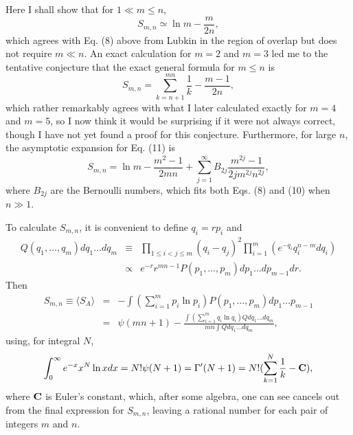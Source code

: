 Here I shall show that for $1\ll m\leq n$,
	\begin{equation}
	S_{m,n} \simeq \ln m - \frac{m}{2n},
	\end{equation}
which agrees with Eq. (8) above from Lubkin \cite{L1} in the region
of overlap
but does not require $m\ll n$.  An exact calculation for $m=2$ and
$m=3$ led me
to the tentative conjecture that the exact general formula for $m\leq
n$ is
	\begin{equation}
	S_{m,n}=\sum_{k=n+1}^{mn}\frac{1}{k} - \frac{m-1}{2n},
	\end{equation}
which rather remarkably agrees with what I later calculated exactly
for $m=4$
and $m=5$, so I now think it would be surprising if it were not
always correct,
though I have not yet found a proof for this conjecture.
Furthermore, for
large $n$, the asymptotic expansion for Eq. (11) is
	\begin{equation}
	S_{m,n}=\ln m - \frac{m^2-1}{2mn}
	+ \sum_{j=1}^{\infty} B_{2j} \frac{m^{2j}-1}{2jm^{2j}n^{2j}},
	\end{equation}
where $B_{2j}$ are the Bernoulli numbers, which fits both Eqs. (8)
and (10)
when $n\gg 1$.

To calculate $S_{m,n}$, it is convenient to define $q_i = rp_i$ and
	\begin{eqnarray}
	Q(q_1,\ldots,q_m)dq_1\ldots dq_m &\equiv &
	\prod_{1\leq i<j\leq m} (q_i-q_j)^2
	\prod_{i=1}^{m} (e^{-q_i}q_i^{n-m}dq_i) \nonumber \\
	 &\propto &e^{-r}r^{mn-1}P(p_1,\ldots,p_m)dp_1\ldots
dp_{m-1}dr.
	\end{eqnarray}
Then
	\begin{eqnarray}
	S_{m,n} \equiv \langle S_A\rangle &=&
	-\int (\sum_{i=1}^{m} p_i \ln p_i)P(p_1,\ldots,p_m)dp_1\ldots
p_{m-1}
	\nonumber \\&=&
	\psi(mn+1)-\frac{\int (\sum_{i=1}^{m}q_i \ln q_i)Q dq_1\ldots
dq_m}
	{mn\int Q dq_1\ldots dq_m},
	\end{eqnarray}
using, for integral $N$,
	\begin{equation}
	\int_{0}^{\infty}e^{-x}x^N\ln x dx = N!\psi (N+1) =
	\Gamma'(N+1) = N!(\sum_{k=1}^{N}\frac{1}{k} - \bf C),
	\end{equation}
where $\bf C$ is Euler's constant, which, after some algebra, one can
see
cancels out from the final expression for $S_{m,n}$, leaving a
rational number
for each pair of integers $m$ and $n$.

